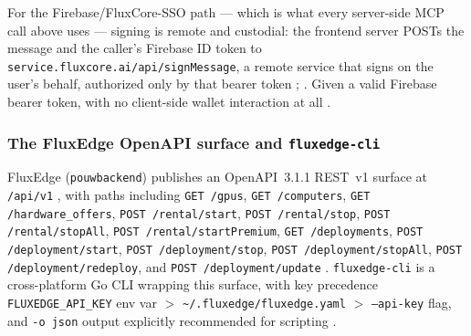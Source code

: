 
For the Firebase/FluxCore-SSO path — which is what every server-side MCP call above uses —
signing is remote and custodial: the frontend server POSTs the message and the caller's
Firebase ID token to \texttt{service.\allowbreak{}fluxcore.\allowbreak{}ai/\allowbreak{}api/\allowbreak{}signMessage}, a remote service that
signs on the user's behalf, authorized only by that bearer token
;
. Given a valid
Firebase bearer token,  with no client-side wallet interaction at all
.

\subsubsection{The FluxEdge OpenAPI surface and \texttt{fluxedge-cli}}
\shipped

FluxEdge (\texttt{pouwbackend}) publishes an OpenAPI~3.1.1 REST~v1 surface at
\texttt{/api/v1} , with paths including
\texttt{GET /gpus}, \texttt{GET /computers}, \texttt{GET /\allowbreak{}hardware\_offers},
\texttt{POST /\allowbreak{}rental/\allowbreak{}start}, \texttt{POST /\allowbreak{}rental/\allowbreak{}stop}, \texttt{POST /\allowbreak{}rental/\allowbreak{}stopAll},
\texttt{POST /\allowbreak{}rental/\allowbreak{}startPremium}, \texttt{GET /\allowbreak{}deployments},
\texttt{POST /\allowbreak{}deployment/\allowbreak{}start}, \texttt{POST /\allowbreak{}deployment/\allowbreak{}stop},
\texttt{POST /\allowbreak{}deployment/\allowbreak{}stopAll}, \texttt{POST /\allowbreak{}deployment/\allowbreak{}redeploy}, and
\texttt{POST /\allowbreak{}deployment/\allowbreak{}update} .
\texttt{fluxedge-cli} is a cross-platform Go CLI wrapping this surface, with key precedence
\texttt{FLUXEDGE\_API\_KEY} env var $>$ \texttt{\textasciitilde{}/.fluxedge/fluxedge.yaml}
$>$ \texttt{--api-key} flag, and \texttt{-o json} output explicitly recommended for
scripting .

